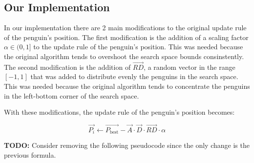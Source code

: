 \subsection{Our Implementation}

In our implementation there are 2 main modifications to the original update rule of the penguin's position.
The first modification is the addition of a scaling factor $\alpha \in (0,1]$ to the update rule of the penguin's position. This was needed because the original algorithm tends to overshoot the search space bounds consinstently. The second modification is the addition of $\vec{RD}$, a random vector in the range $[-1, 1]$ that was added to distribute evenly the penguins in the search space. This was needed because the original algorithm tends to concentrate the penguins in the left-bottom corner of the search space.

With these modifications, the update rule of the penguin's position becomes:

$$ \vec{P_i} \gets \vec{P_{\text{best}}} - \vec{A} \cdot \vec{D} \cdot \vec{RD} \cdot \alpha $$

\textbf{TODO:} Consider removing the following pseudocode since the only change is the previous formula.

